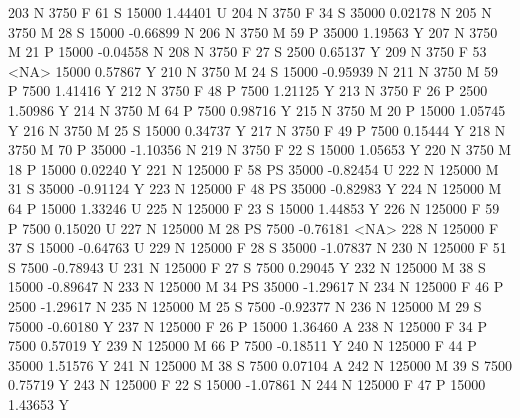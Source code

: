 \documentclass{article}
\begin{document}
\begin{Schunk}
\begin{Soutput}
203       N       3750   F  61         S  15000   1.44401    U
204       N       3750   F  34         S  35000   0.02178    N
205       N       3750   M  28         S  15000  -0.66899    N
206       N       3750   M  59         P  35000   1.19563    Y
207       N       3750   M  21         P  15000  -0.04558    N
208       N       3750   F  27         S   2500   0.65137    Y
209       N       3750   F  53      <NA>  15000   0.57867    Y
210       N       3750   M  24         S  15000  -0.95939    N
211       N       3750   M  59         P   7500   1.41416    Y
212       N       3750   F  48         P   7500   1.21125    Y
213       N       3750   F  26         P   2500   1.50986    Y
214       N       3750   M  64         P   7500   0.98716    Y
215       N       3750   M  20         P  15000   1.05745    Y
216       N       3750   M  25         S  15000   0.34737    Y
217       N       3750   F  49         P   7500   0.15444    Y
218       N       3750   M  70         P  35000  -1.10356    N
219       N       3750   F  22         S  15000   1.05653    Y
220       N       3750   M  18         P  15000   0.02240    Y
221       N     125000   F  58        PS  35000  -0.82454    U
222       N     125000   M  31         S  35000  -0.91124    Y
223       N     125000   F  48        PS  35000  -0.82983    Y
224       N     125000   M  64         P  15000   1.33246    U
225       N     125000   F  23         S  15000   1.44853    Y
226       N     125000   F  59         P   7500   0.15020    U
227       N     125000   M  28        PS   7500  -0.76181 <NA>
228       N     125000   F  37         S  15000  -0.64763    U
229       N     125000   F  28         S  35000  -1.07837    N
230       N     125000   F  51         S   7500  -0.78943    U
231       N     125000   F  27         S   7500   0.29045    Y
232       N     125000   M  38         S  15000  -0.89647    N
233       N     125000   M  34        PS  35000  -1.29617    N
234       N     125000   F  46         P   2500  -1.29617    N
235       N     125000   M  25         S   7500  -0.92377    N
236       N     125000   M  29         S  75000  -0.60180    Y
237       N     125000   F  26         P  15000   1.36460    A
238       N     125000   F  34         P   7500   0.57019    Y
239       N     125000   M  66         P   7500  -0.18511    Y
240       N     125000   F  44         P  35000   1.51576    Y
241       N     125000   M  38         S   7500   0.07104    A
242       N     125000   M  39         S   7500   0.75719    Y
243       N     125000   F  22         S  15000  -1.07861    N
244       N     125000   F  47         P  15000   1.43653    Y

\end{Soutput}
\end{Schunk}
\end{document}
